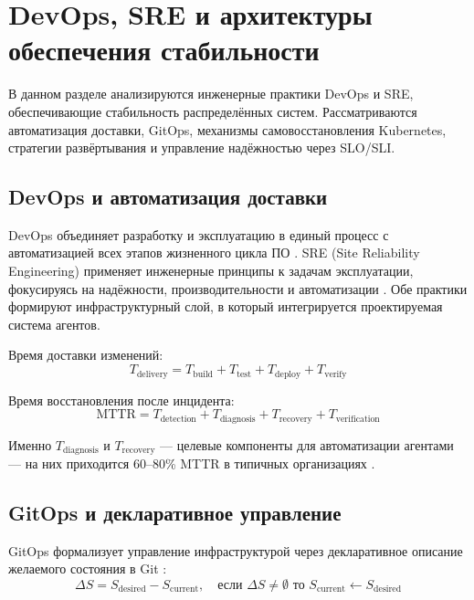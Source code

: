\chapter{DevOps, SRE и архитектуры обеспечения стабильности}\label{ch:devops}

В данном разделе анализируются инженерные практики DevOps и SRE, обеспечивающие стабильность распределённых систем. Рассматриваются автоматизация доставки, GitOps, механизмы самовосстановления Kubernetes, стратегии развёртывания и управление надёжностью через SLO/SLI.

\section{DevOps и автоматизация доставки}

DevOps объединяет разработку и эксплуатацию в единый процесс с автоматизацией всех этапов жизненного цикла ПО \cite{kim_devops_handbook,devops_culture}. SRE (Site Reliability Engineering) применяет инженерные принципы к задачам эксплуатации, фокусируясь на надёжности, производительности и автоматизации \cite{google_sre_book,sre_principles,russian_sre}. Обе практики формируют инфраструктурный слой, в который интегрируется проектируемая система агентов.

Время доставки изменений:
\begin{equation}
T_{\text{delivery}} = T_{\text{build}} + T_{\text{test}} + T_{\text{deploy}} + T_{\text{verify}}
\label{eq:delivery_time}
\end{equation}

Время восстановления после инцидента:
\begin{equation}
\text{MTTR} = T_{\text{detection}} + T_{\text{diagnosis}} + T_{\text{recovery}} + T_{\text{verification}}
\label{eq:mttr_components}
\end{equation}

Именно $T_{\text{diagnosis}}$ и $T_{\text{recovery}}$ --- целевые компоненты для автоматизации агентами --- на них приходится 60--80\% MTTR в типичных организациях \cite{continuous_deployment}.

\section{GitOps и декларативное управление}

GitOps формализует управление инфраструктурой через декларативное описание желаемого состояния в Git \cite{weaveworks_gitops}:
\begin{equation}
\Delta S = S_{\text{desired}} - S_{\text{current}}, \quad \text{если } \Delta S \neq \emptyset \text{ то } S_{\text{current}} \leftarrow S_{\text{desired}}
\label{eq:gitops}
\end{equation}


